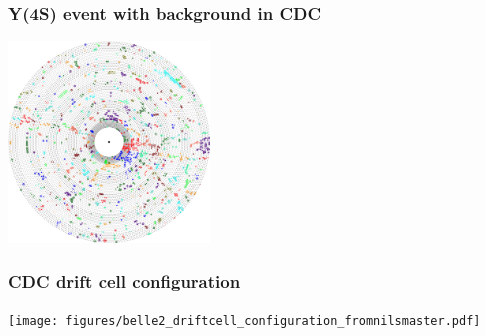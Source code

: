\documentclass[18pt, aspectratio=169]{beamer}
\begin{document}
\begin{frame}
  \frametitle{Y(4S) event with background in CDC}
  \begin{center}
    \includegraphics[width=0.4\textwidth]{figures/cdc_2d_eventdisplay_background.png}
  \end{center}
\end{frame}

\begin{frame}
  \frametitle{CDC drift cell configuration}
  \begin{center}
    \texttt{[image: figures/belle2\_driftcell\_configuration\_fromnilsmaster.pdf]}
  \end{center}
\end{frame}
\end{document}
